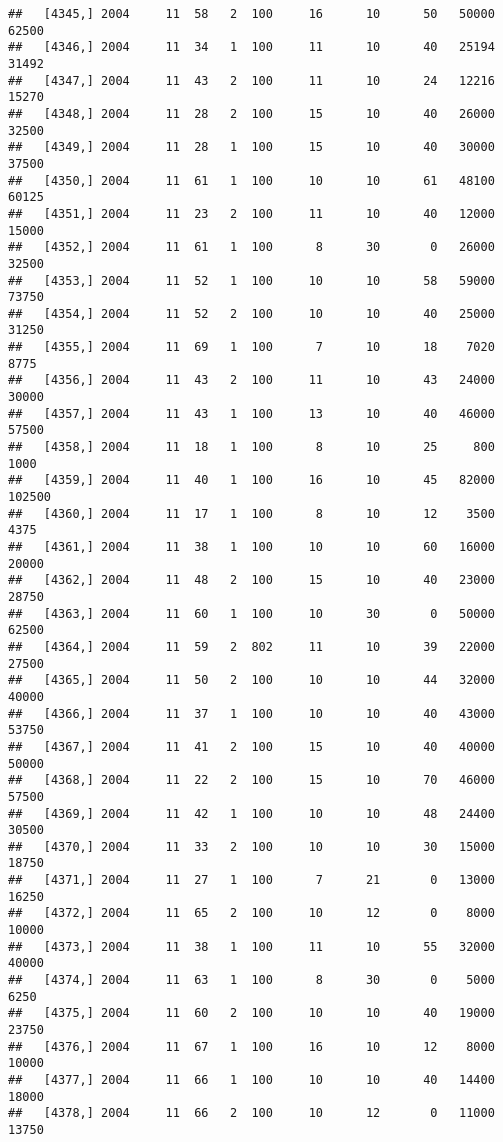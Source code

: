 \documentclass{article}\usepackage[]{graphicx}\usepackage[]{color}
\makeatletter
\newenvironment{kframe}{%
 \def\at@end@of@kframe{}%
 \ifinner\ifhmode%
  \def\at@end@of@kframe{\end{minipage}}%
  \begin{minipage}{\columnwidth}%
 \fi\fi%
 \def\FrameCommand##1{\hskip\@totalleftmargin \hskip-\fboxsep
 \colorbox{shadecolor}{##1}\hskip-\fboxsep
     \hskip-\linewidth \hskip-\@totalleftmargin \hskip\columnwidth}%
 \MakeFramed {\advance\hsize-\width
   \@totalleftmargin\z@ \linewidth\hsize
   \@setminipage}}%
 {\par\unskip\endMakeFramed%
 \at@end@of@kframe}
\newenvironment{knitrout}{}{} %
\makeatother
\begin{document}
\begin{knitrout}
\begin{kframe}
\begin{verbatim}
##   [4345,] 2004     11  58   2  100     16      10      50   50000   62500
##   [4346,] 2004     11  34   1  100     11      10      40   25194   31492
##   [4347,] 2004     11  43   2  100     11      10      24   12216   15270
##   [4348,] 2004     11  28   2  100     15      10      40   26000   32500
##   [4349,] 2004     11  28   1  100     15      10      40   30000   37500
##   [4350,] 2004     11  61   1  100     10      10      61   48100   60125
##   [4351,] 2004     11  23   2  100     11      10      40   12000   15000
##   [4352,] 2004     11  61   1  100      8      30       0   26000   32500
##   [4353,] 2004     11  52   1  100     10      10      58   59000   73750
##   [4354,] 2004     11  52   2  100     10      10      40   25000   31250
##   [4355,] 2004     11  69   1  100      7      10      18    7020    8775
##   [4356,] 2004     11  43   2  100     11      10      43   24000   30000
##   [4357,] 2004     11  43   1  100     13      10      40   46000   57500
##   [4358,] 2004     11  18   1  100      8      10      25     800    1000
##   [4359,] 2004     11  40   1  100     16      10      45   82000  102500
##   [4360,] 2004     11  17   1  100      8      10      12    3500    4375
##   [4361,] 2004     11  38   1  100     10      10      60   16000   20000
##   [4362,] 2004     11  48   2  100     15      10      40   23000   28750
##   [4363,] 2004     11  60   1  100     10      30       0   50000   62500
##   [4364,] 2004     11  59   2  802     11      10      39   22000   27500
##   [4365,] 2004     11  50   2  100     10      10      44   32000   40000
##   [4366,] 2004     11  37   1  100     10      10      40   43000   53750
##   [4367,] 2004     11  41   2  100     15      10      40   40000   50000
##   [4368,] 2004     11  22   2  100     15      10      70   46000   57500
##   [4369,] 2004     11  42   1  100     10      10      48   24400   30500
##   [4370,] 2004     11  33   2  100     10      10      30   15000   18750
##   [4371,] 2004     11  27   1  100      7      21       0   13000   16250
##   [4372,] 2004     11  65   2  100     10      12       0    8000   10000
##   [4373,] 2004     11  38   1  100     11      10      55   32000   40000
##   [4374,] 2004     11  63   1  100      8      30       0    5000    6250
##   [4375,] 2004     11  60   2  100     10      10      40   19000   23750
##   [4376,] 2004     11  67   1  100     16      10      12    8000   10000
##   [4377,] 2004     11  66   1  100     10      10      40   14400   18000
##   [4378,] 2004     11  66   2  100     10      12       0   11000   13750

\end{verbatim}
\end{kframe}
\end{knitrout}
\end{document}
